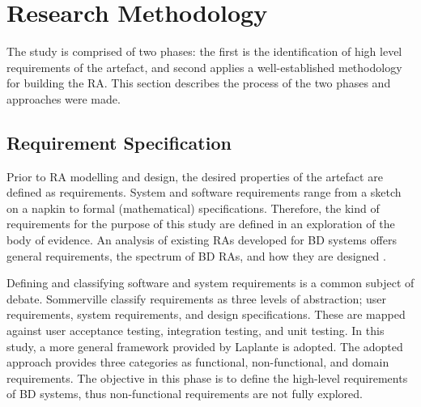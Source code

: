 \documentclass[conference]{IEEEtran}
\begin{document}
\section{Research Methodology}
The study is comprised of two phases: the first is the identification of high level requirements of the artefact, and second applies a well-established methodology for building the RA. This section describes the process of the two phases and approaches were made.


\subsection{Requirement Specification}
Prior to RA modelling and design, the desired properties of the artefact are defined as requirements. System and software requirements range from a sketch on a napkin to formal (mathematical) specifications. Therefore, the kind of requirements for the purpose of this study are defined in an exploration of the body of evidence. An analysis of existing RAs developed for BD systems offers general requirements, the spectrum of BD RAs, and how they are designed \cite{ataei2020big}.  

Defining and classifying software and system requirements is a common subject of debate. Sommerville \cite{sommerville2011software} classify requirements as three levels of abstraction; user requirements, system requirements, and design specifications. These are mapped against user acceptance testing, integration testing, and unit testing. In this study, a more general framework provided by Laplante \cite{laplante2017requirements} is adopted. The adopted approach provides three categories as functional, non-functional, and domain requirements. The objective in this phase is to define the high-level requirements of BD systems, thus non-functional requirements are not fully explored. 

\end{document}
